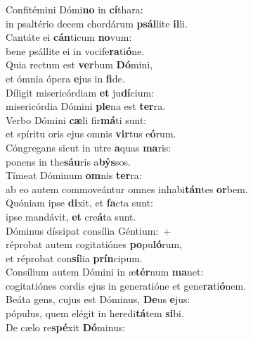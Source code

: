 \evenverse Confitémini Dómi\textbf{no} in \textbf{cí}thara:~\*\\
\evenverse in psaltério decem chordárum \textbf{psál}lite \textbf{il}li.\\
\oddverse Cantáte ei \textbf{cán}ticum \textbf{no}vum:~\*\\
\oddverse bene psállite ei in vocife\textbf{ra}ti\textbf{ó}ne.\\
\evenverse Quia rectum est \textbf{ver}bum \textbf{Dó}mini,~\*\\
\evenverse et ómnia ópera \textbf{e}jus in \textbf{fi}de.\\
\oddverse Díligit misericórdiam \textbf{et} ju\textbf{dí}cium:~\*\\
\oddverse misericórdia Dómini \textbf{ple}na est \textbf{ter}ra.\\
\evenverse Verbo Dómini \textbf{cæ}li fir\textbf{má}ti sunt:~\*\\
\evenverse et spíritu oris ejus omnis \textbf{vir}tus e\textbf{ó}rum.\\
\oddverse Cóngregans sicut in utre \textbf{a}quas \textbf{ma}ris:~\*\\
\oddverse ponens in the\textbf{sáu}ris a\textbf{býs}sos.\\
\evenverse Tímeat Dóminum \textbf{om}nis \textbf{ter}ra:~\*\\
\evenverse ab eo autem commoveántur omnes inhabi\textbf{tán}tes \textbf{or}bem.\\
\oddverse Quóniam ipse \textbf{di}xit, et \textbf{fa}cta sunt:~\*\\
\oddverse ipse mandávit, \textbf{et} cre\textbf{á}ta sunt.\\
\evenverse Dóminus díssipat consília Géntium:~+\\
\evenverse  réprobat autem cogitatiónes \textbf{po}pu\textbf{ló}rum,~\*\\
\evenverse et réprobat con\textbf{sí}lia \textbf{prín}cipum.\\
\oddverse Consílium autem Dómini in æ\textbf{tér}num \textbf{ma}net:~\*\\
\oddverse cogitatiónes cordis ejus in generatióne et gene\textbf{ra}ti\textbf{ó}nem.\\
\evenverse Beáta gens, cujus est Dóminus, \textbf{De}us \textbf{e}jus:~\*\\
\evenverse pópulus, quem elégit in heredi\textbf{tá}tem \textbf{si}bi.\\
\oddverse De cælo re\textbf{spé}xit \textbf{Dó}minus:~\*\\
